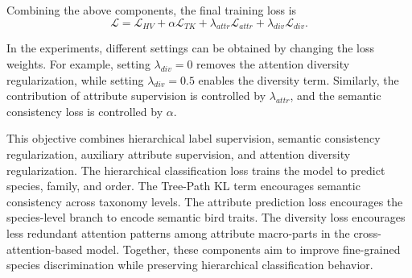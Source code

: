 Combining the above components, the final training loss is
\begin{equation}
    \mathcal{L}
    =
    \mathcal{L}_{HV}
    +
    \alpha \mathcal{L}_{TK}
    +
    \lambda_{attr}\mathcal{L}_{attr}
    +
    \lambda_{div}\mathcal{L}_{div}.
\end{equation}

In the experiments, different settings can be obtained by changing the loss weights. For example, setting \(\lambda_{div}=0\) removes the attention diversity regularization, while setting \(\lambda_{div}=0.5\) enables the diversity term. Similarly, the contribution of attribute supervision is controlled by \(\lambda_{attr}\), and the semantic consistency loss is controlled by \(\alpha\).

This objective combines hierarchical label supervision, semantic consistency regularization, auxiliary attribute supervision, and attention diversity regularization. The hierarchical classification loss trains the model to predict species, family, and order. The Tree-Path KL term encourages semantic consistency across taxonomy levels. The attribute prediction loss encourages the species-level branch to encode semantic bird traits. The diversity loss encourages less redundant attention patterns among attribute macro-parts in the cross-attention-based model. Together, these components aim to improve fine-grained species discrimination while preserving hierarchical classification behavior.